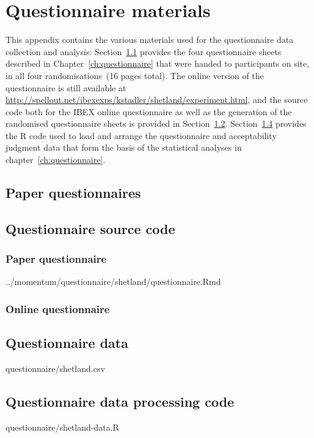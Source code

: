 \documentclass[oneside]{book}
\newcommand{\includeR}[1]{#1}
\begin{document}
\chapter{Questionnaire materials}
\label{app:questionnaire}
This appendix contains the various materials used for the questionnaire data collection and analysis: Section~\ref{app:paperquestionnaire} provides the four questionnaire sheets described in Chapter~\ref{ch:questionnaire} that were handed to participants on site, in all four randomisations~(16 pages total). The online version of the questionnaire is still available at \url{http://spellout.net/ibexexps/kstadler/shetland/experiment.html}, and the source code both for the IBEX online questionnaire as well as the generation of the randomised questionnaire sheets is provided in Section~\ref{app:questionnairecode}. Section~\ref{app:questionnairedatacode} provides the R code used to load and arrange the questionnaire and acceptability judgment data that form the basis of the statistical analyses in chapter~\ref{ch:questionnaire}.

\section{Paper questionnaires}
\label{app:paperquestionnaire}
%
%
\section{Questionnaire source code}
\label{app:questionnairecode}
\subsection{Paper questionnaire}

\includeR{../momentum/questionnaire/shetland/questionnaire.Rmd}
\subsection{Online questionnaire}

\section{Questionnaire data}
\includeR{questionnaire/shetland.csv}

\section{Questionnaire data processing code}
\label{app:questionnairedatacode}

\includeR{questionnaire/shetland-data.R}
\end{document}
